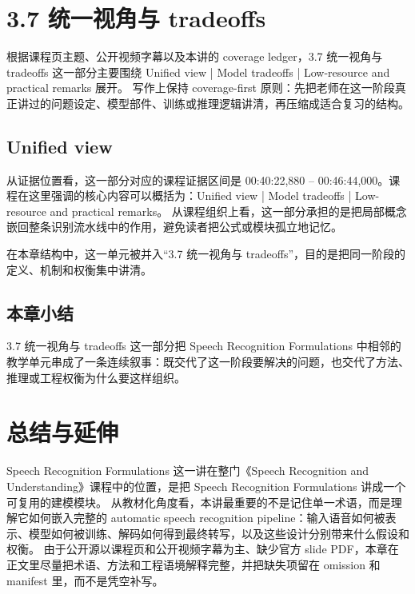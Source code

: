 \documentclass[a4paper]{article}
\begin{document}
\section{3.7 统一视角与 tradeoffs}
根据课程页主题、公开视频字幕以及本讲的 coverage ledger，3.7 统一视角与 tradeoffs 这一部分主要围绕 Unified view | Model tradeoffs | Low-resource and practical remarks 展开。
写作上保持 coverage-first 原则：先把老师在这一阶段真正讲过的问题设定、模型部件、训练或推理逻辑讲清，再压缩成适合复习的结构。

\subsection{Unified view}
从证据位置看，这一部分对应的课程证据区间是 00:40:22,880 -- 00:46:44,000。课程在这里强调的核心内容可以概括为：Unified view | Model tradeoffs | Low-resource and practical remarks。
从课程组织上看，这一部分承担的是把局部概念嵌回整条识别流水线中的作用，避免读者把公式或模块孤立地记忆。

在本章结构中，这一单元被并入“3.7 统一视角与 tradeoffs”，目的是把同一阶段的定义、机制和权衡集中讲清。

\subsection{本章小结}
3.7 统一视角与 tradeoffs 这一部分把 Speech Recognition Formulations 中相邻的教学单元串成了一条连续叙事：既交代了这一阶段要解决的问题，也交代了方法、推理或工程权衡为什么要这样组织。

\section{总结与延伸}
Speech Recognition Formulations 这一讲在整门《Speech Recognition and Understanding》课程中的位置，是把 Speech Recognition Formulations 讲成一个可复用的建模模块。
从教材化角度看，本讲最重要的不是记住单一术语，而是理解它如何嵌入完整的 automatic speech recognition pipeline：输入语音如何被表示、模型如何被训练、解码如何得到最终转写，以及这些设计分别带来什么假设和权衡。
由于公开源以课程页和公开视频字幕为主、缺少官方 slide PDF，本章在正文里尽量把术语、方法和工程语境解释完整，并把缺失项留在 omission 和 manifest 里，而不是凭空补写。
\end{document}
